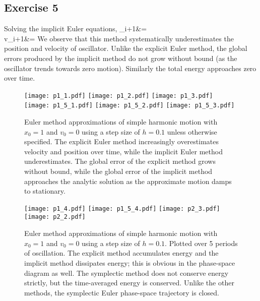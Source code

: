 \documentclass{article}
\def\bal#1\eal{\begin{align}#1\end{align}}
\theoremstyle{definition}
\begin{document}
\subsection*{Exercise 5}
Solving the implicit Euler equations,
\bal
x_{i+1}&=\\
v_{i+1}&=
\eal
We observe that this method systematically underestimates the position and velocity of oscillator. Unlike the explicit Euler method, the global errors produced by the implicit method do not grow without bound (as the oscillator trends towards zero motion). Similarly the total energy approaches zero over time. 

\begin{sidewaysfigure}[ht]
\centering
\texttt{[image: p1\_1.pdf]}%
\texttt{[image: p1\_2.pdf]}%
\texttt{[image: p1\_3.pdf]}
\\
\texttt{[image: p1\_5\_1.pdf]}%
\texttt{[image: p1\_5\_2.pdf]}%
\texttt{[image: p1\_5\_3.pdf]}
\caption{Euler method approximations of simple harmonic motion with $x_0 = 1$ and $v_0=0$ using a step size of $h=0.1$ unless otherwise specified. The explicit Euler method increasingly overestimates velocity and position over time, while the implicit Euler method underestimates. The global error of the explicit method grows without bound, while the global error of the implicit method approaches the analytic solution as the approximate motion damps to stationary.}
\label{fig:motion}
\end{sidewaysfigure}

\begin{sidewaysfigure}[ht]
\centering
\texttt{[image: p1\_4.pdf]}%
\texttt{[image: p1\_5\_4.pdf]}%
\texttt{[image: p2\_3.pdf]}
\\
\texttt{[image: p2\_2.pdf]}
\caption{Euler method approximations of simple harmonic motion with $x_0 = 1$ and $v_0=0$ using a step size of $h=0.1$. Plotted over 5 periods of oscillation. The explicit method accumulates energy and the implicit method dissipates energy; this is obvious in the phase-space diagram as well. The symplectic method does not conserve energy strictly, but the time-averaged energy is conserved. Unlike the other methods, the symplectic Euler phase-space trajectory is  closed.}
\label{fig:energy}
\end{sidewaysfigure}
\end{document}
